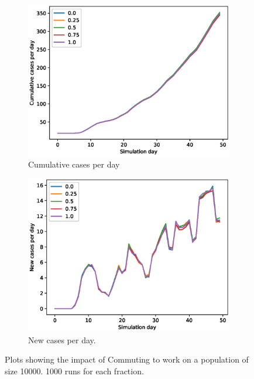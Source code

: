 \documentclass[runningheads]{llncs}
\begin{document}
\begin{figure}[h!]
	\centering
	\begin{subfigure}[b]{0.7\linewidth}
		\includegraphics[width=\textwidth]{work_cum_1.eps}
		\caption{Cumulative cases per day} 
	\end{subfigure}
	\begin{subfigure}[b]{0.7\linewidth}
		\includegraphics[width=\textwidth]{work_cases_per_day_1.eps}
		\caption{New cases per day.} 
	\end{subfigure}
	\caption{Plots showing the impact of Commuting to work on a population of size 10000. 1000 runs for each fraction. }
	\label{VaccinePlot}
\end{figure}
\end{document}
